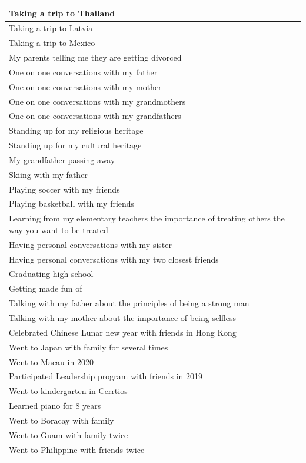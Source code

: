 \documentclass[
  .7em,
  letterpaper,
  DIV=11,
  numbers=noendperiod]{scrartcl}
\begin{document}
\begin{table}
\begin{tabular}{l}
\hline
Taking a trip to Thailand\\
\hline
Taking a trip to Latvia\\
\hline
Taking a trip to Mexico\\
\hline
My parents telling me they are getting divorced\\
\hline
One on one conversations with my father\\
\hline
One on one conversations with my mother\\
\hline
One on one conversations with my grandmothers\\
\hline
One on one conversations with my grandfathers\\
\hline
Standing up for my religious heritage\\
\hline
Standing up for my cultural heritage\\
\hline
My grandfather passing away\\
\hline
Skiing with my father\\
\hline
Playing soccer with my friends\\
\hline
Playing basketball with my friends\\
\hline
Learning from my elementary teachers the importance of treating others the way you want to be treated\\
\hline
Having personal conversations with my sister\\
\hline
Having personal conversations with my two closest friends\\
\hline
Graduating high school\\
\hline
Getting made fun of\\
\hline
Talking with my father about the principles of being a strong man\\
\hline
Talking with my mother about the importance of being selfless\\
\hline
Celebrated Chinese Lunar new year with friends in Hong Kong\\
\hline
Went to Japan with family for several times\\
\hline
Went to Macau in 2020\\
\hline
Participated Leadership program with friends in 2019\\
\hline
Went to kindergarten in Cerrtios\\
\hline
Learned piano for 8 years\\
\hline
Went to Boracay with family\\
\hline
Went to Guam with family twice\\
\hline
Went to Philippine with friends twice\\

\end{tabular}
\end{table}
\end{document}
